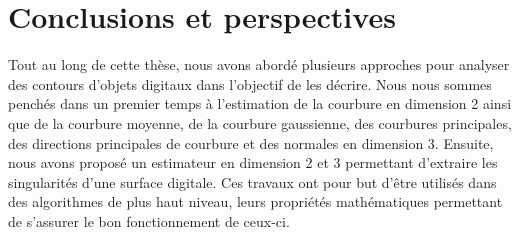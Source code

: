 %
%
%
\chapter{Conclusions et perspectives}
\label{sec:conclusion}


Tout au long de cette thèse, nous avons abordé plusieurs approches pour analyser
des contours d'objets digitaux dans l'objectif de les décrire. Nous nous sommes
penchés dans un premier temps à l'estimation de la courbure en dimension 2 ainsi
que de la courbure moyenne, de la courbure gaussienne, des courbures
principales, des directions principales de courbure et des normales en dimension
3. Ensuite, nous avons proposé un estimateur en dimension 2 et 3 permettant
d'extraire les singularités d'une surface digitale. Ces travaux ont pour but
d'être utilisés dans des algorithmes de plus haut niveau, leurs  propriétés
mathématiques permettant de s'assurer le bon fonctionnement de ceux-ci.


